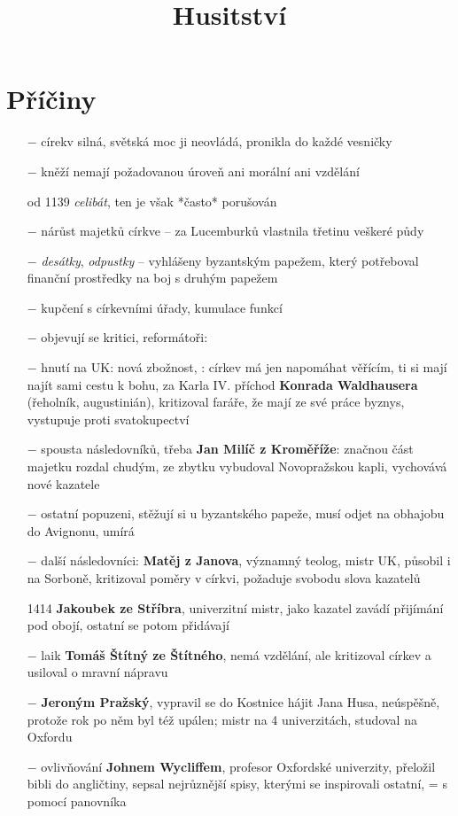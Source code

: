 \documentclass{article}
\title{\vspace{-2cm}Husitství\vspace{-1.7cm}}
\date{}
\author{}
\begin{document}
\maketitle

\section*{Příčiny}
\begin{itemize}
    \vspace{-0.5em}
    \setlength\itemsep{0.15em}
    \item[$-$] círekv silná, světská moc ji neovládá, pronikla do každé vesničky
    \item[$-$] kněží nemají požadovanou úroveň ani morální ani vzdělání
    \item[od 1139] \textit{celibát}, ten je však *často* porušován
    \item[$-$] nárůst majetků církve -- za Lucemburků vlastnila třetinu veškeré půdy
    \item[$-$] \textit{desátky}, \textit{odpustky} -- vyhlášeny byzantským papežem, který potřeboval finanční prostředky na boj s druhým papežem
    \item[$-$] kupčení s církevními úřady, kumulace funkcí
    \item[$-$] objevují se kritici, reformátoři: 
    \item[$-$] hnutí na UK: nová zbožnost, : církev má jen napomáhat věřícím, ti si mají najít sami cestu k bohu, za Karla IV. příchod \textbf{Konrada Waldhausera} (řeholník, augustinián), kritizoval faráře, že mají ze své práce byznys, vystupuje proti svatokupectví
    \item[$-$] spousta následovníků, třeba \textbf{Jan Milíč z Kroměříže}: značnou část majetku rozdal chudým, ze zbytku vybudoval Novopražskou kapli, vychovává nové kazatele
    \item[$-$] ostatní popuzeni, stěžují si u byzantského papeže, musí odjet na obhajobu do Avignonu, umírá
    \item[$-$] další následovníci: \textbf{Matěj z Janova}, významný teolog, mistr UK, působil i na Sorboně, kritizoval poměry v církvi, požaduje svobodu slova kazatelů
    \item[1414] \textbf{Jakoubek ze Stříbra}, univerzitní mistr, jako kazatel zavádí přijímání pod obojí, ostatní se potom přidávají
    \item[$-$] laik \textbf{Tomáš Štítný ze Štítného}, nemá vzdělání, ale kritizoval církev a usiloval o mravní nápravu
    \item[$-$] \textbf{Jeroným Pražský}, vypravil se do Kostnice hájit Jana Husa, neúspěšně, protože rok po něm byl též upálen; mistr na 4 univerzitách, studoval na Oxfordu
    \item[$-$] ovlivňování \textbf{Johnem Wycliffem}, profesor Oxfordské univerzity, přeložil bibli do angličtiny, sepsal nejrůznější spisy, kterými se inspirovali ostatní,  = s pomocí panovníka
\end{itemize}
\end{document}
